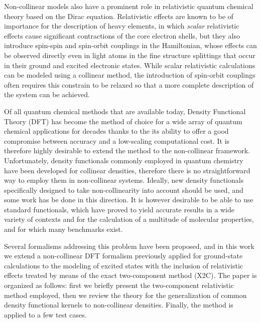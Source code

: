 \documentclass[12pt]{article}
\begin{document}
Non-collinear models also have a prominent role in relativistic quantum chemical theory based on the Dirac equation.\cite{Dyall07_book,Reiher15_book}
Relativistic effects are known to be of importance for the description of heavy elements, in which \textit{scalar} relativistic effects cause significant contractions of the core electron shells,\cite{Pyykko12_45} but they also introduce spin-spin and spin-orbit couplings in the Hamiltonian, whose effects can be observed directly even in light atoms in the fine structure splittings that occur in their ground and excited electronic states.
While scalar relativistic calculations can be modeled using a collinear method, the introduction of spin-orbit couplings often requires this constrain to be relaxed so that a more complete description of the system can be achieved.

Of all quantum chemical methods that are available today, Density Functional Theory (DFT) has become the method of choice for a wide array of quantum chemical applications for decades thanks to the its ability to offer a good compromise between accuracy and a low-scaling computational cost.
It is therefore highly desirable to extend the method to the non-collinear framework.
Unfortunately, density functionals commonly employed in quantum chemistry have been developed for collinear densities, therefore there is no straightforward way to employ them in non-collinear systems.
Ideally, new density functionals specifically designed to take non-collinearity into account should be used, and some work has be done in this direction.\cite{Gross13_156401}
It is however desirable to be able to use standard functionals, which have proved to yield accurate results in a wide variety of contexts and for the calculation of a multitude of molecular properties, and for which many benchmarks exist.

Several formalisms addressing this problem have been proposed,\cite{vanWullen02_779,Frisch07_125119,Frisch12_2193,Scuseria13_035117,Liu04_6658,Liu05_241102,Liu03_597,Liu05_054102} and in this work we extend a non-collinear DFT formalism previously applied for ground-state calculations\cite{Frisch07_125119,Frisch12_2193,Scuseria13_035117} to the modeling of excited states with the inclusion of relativistic effects treated by means of the exact two-component method (X2C).\cite{Liu05_241102,Peng06_044102,Saue07_064102,Peng09_031104,Reiher13_184105,Cheng07_104106}
The paper is organized as follows: first we briefly present the two-component relativistic method employed, then we review the theory for the generalization of common density functional kernels to non-collinear densities. Finally, the method is applied to a few test cases.
\end{document}
